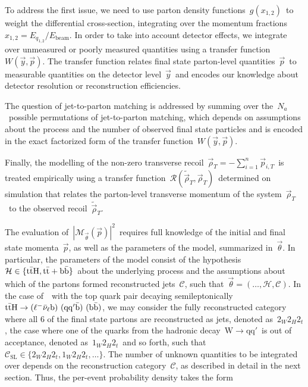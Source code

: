 To address the first issue, we need to use parton density functions~$g(x_{1,2})$~to weight the differential cross-section, integrating over the momentum fractions~$x_{1,2} = E_{q_{1,2}}/E_{\mathrm{beam}}$.
In order to take into account detector effects, we integrate over unmeasured or poorly measured quantities using a transfer function~$W(\vec{y}, \vec{p})$.
The transfer function relates final state parton-level quantities~$\vec{p}$~to measurable quantities on the detector level~$\vec{y}$~and encodes our knowledge about detector resolution or reconstruction efficiencies.

The question of jet-to-parton matching is addressed by summing over the~$N_a$~possible permutations of jet-to-parton matching, which depends on assumptions about the process and the number of observed final state particles and is encoded in the exact factorized form of the transfer function~$W(\vec{y}, \vec{p})$.

Finally, the modelling of the non-zero transverse recoil~$\vec{\rho}_T = -\sum_{i=1}^n \vec{p}_{i,T}$~is treated empirically using a transfer function~$\mathcal{R}(\tilde{\vec{\rho}}_T, \vec{\rho}_T)$~determined on simulation that relates the parton-level transverse momentum of the system~$\vec{\rho}_T$~to the observed recoil~$\tilde{\vec{\rho}}_T$. 

The evaluation of~$|\mathcal{M}_{\vec{\theta}}(\vec{p})|^2$~requires full knowledge of the initial and final state momenta~$\vec{p}$, as well as the parameters of the model, summarized in~$\vec{\theta}$. In particular, the parameters of the model consist of the hypothesis~$\mathcal{H} \in \{\mathrm{t} \bar{\mathrm{t}} \mathrm{H}, \mathrm{t} \bar{\mathrm{t}} + \mathrm{b}\bar{\mathrm{b}}\}$~about the underlying process and the assumptions about which of the partons formed reconstructed jets~$\mathcal{C}$, such that~$\vec{\theta} = (\dots, \mathcal{H}, \mathcal{C})$. In the case of~\ttH~with the top quark pair decaying semileptonically~$\mathrm{t} \bar{\mathrm{t}} \mathrm{H} \rightarrow (\ell^- \bar{\mathrm{\nu}}_\ell \mathrm{b})\ (\mathrm{q} \mathrm{q}' \bar{\mathrm{b}})\ (\mathrm{b} \bar{\mathrm{b}})$, we may consider the fully reconstructed category where all 6 of the final state partons are reconstructed as jets, denoted as~$2_W 2_H 2_t$, the case where one of the quarks from the hadronic decay~$\mathrm{W} \rightarrow \mathrm{q} \mathrm{q}'$~is out of acceptance, denoted as~$1_W 2_H 2_t$~and so forth, such that~$\mathcal{C}_{\mathrm{SL}} \in \{ 2_W 2_H 2_t, 1_W 2_H 2_t, \dots \}$. The number of unknown quantities to be integrated over depends on the reconstruction category~$\mathcal{C}$, as described in detail in the next section. 
Thus, the per-event probability density takes the form


